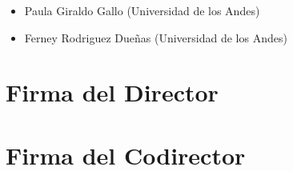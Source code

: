 \documentclass[12pt]{article}
\begin{document}

\begin{itemize}
	\item Paula Giraldo Gallo (Universidad de los Andes)
	\item Ferney Rodriguez Dueñas (Universidad de los Andes)
\end{itemize}





\section*{Firma del Director}
\vspace{1.5cm}

\section*{Firma del Codirector	}
\end{document}
